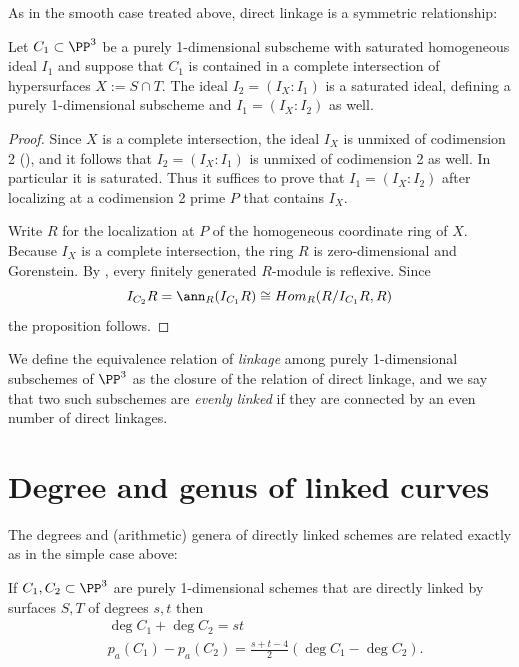 As in the smooth case treated above, direct linkage is a symmetric relationship:
\begin{proposition}\label{link unmixed}
Let $C_1\subset \PP^3$ be a purely 1-dimensional subscheme with saturated homogeneous ideal $I_1$ and suppose that $C_1$ is contained in a complete intersection of
hypersurfaces $X := S\cap T$. The ideal $I_2 = (I_{X}:I_1)$ is a saturated ideal, defining a purely 1-dimensional subscheme and 
$I_1 = (I_{X}: I_2)$ as well.
\end{proposition}
 
\begin{proof}
Since $X$ is a complete intersection, the ideal $I_{X}$ is unmixed of codimension 2
(\cite[Proposition 18.13]{Eisenbud1995}), and it follows
that $I_2 = (I_{X}:I_1)$ is unmixed of codimension 2 as well. In particular it is saturated.
Thus it suffices to prove that $I_1 = (I_{X}: I_2)$ after localizing at a codimension 2 prime $P$
that contains $I_{X}$. 

Write $R$ for the localization at $P$ of the homogeneous coordinate ring of $X$. 
Because $I_{X}$ is a complete intersection, the ring $R$
 is zero-dimensional and Gorenstein.
By \cite[Propositions 21.1 and 21.5]{Eisenbud1995}, every finitely generated $R$-module is reflexive. Since 
$$
I_{C_2}R= \ann_{R}(I_{C_1}R) \cong Hom_R(R/I_{C_1}R, R)
$$
the proposition follows.
\end{proof}

We define the equivalence relation of \emph{linkage} among purely 1-dimensional subschemes of $\PP^{3}$ as the
closure of the relation of direct linkage, and we say that two such subschemes are \emph{evenly linked}
if they are connected by an even number of direct linkages.

\section{Degree and genus of linked curves}

The degrees and (arithmetic) genera 
of directly linked schemes are related exactly as in the simple case above:

\begin{theorem}\label{direct linkage}\label{linked genus formula}
If $C_1,{C_2}\subset \PP^3$ are purely 1-dimensional schemes that are directly linked by surfaces $S,T$ of degrees $s,t$  then 
$$
\begin{aligned}
&\deg C_1+\deg C_2 = st\\
&p_a(C_1) - p_a({C_2}) = \frac{s+t-4}{2}(\deg C_1-\deg {C_2}).
\end{aligned}
 $$
\end{theorem}

